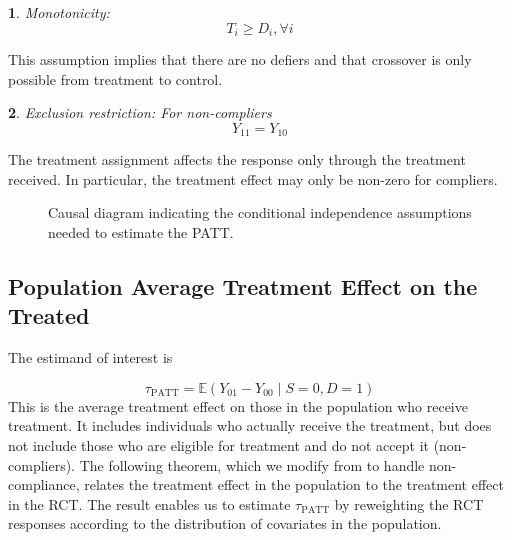 \documentclass[12pt]{article}
\makeatletter
\newtheorem*{assumption*}{\assumptionnumber}
\providecommand{\assumptionnumber}{}
\newenvironment{assumption}[2]
 {%
  \renewcommand{\assumptionnumber}{Assumption #1}%
  \begin{assumption*}%
  \protected@edef\@currentlabel{#1}%
 }
 {%
  \end{assumption*}
 }
\newcommand{\ex}{\mathbb{E}} %
\makeatother
\begin{document}
\begin{assumption}{6}{}\label{monotonicity}
Monotonicity: 
\begin{equation*}
T_i \geq D_i, \forall i
\end{equation*}
\end{assumption}
\noindent This assumption implies that there are no defiers and that crossover is only possible from treatment to control.

\begin{assumption}{7}{}\label{ER}
Exclusion restriction: For non-compliers
\begin{equation*}
Y_{11} = Y_{10}
\end{equation*}  
\end{assumption}
\noindent The treatment assignment affects the response only through the treatment received.  In particular, the treatment effect may only be non-zero for compliers.  

\begin{figure}[h]
\centering
{}
\caption{Causal diagram indicating the conditional independence assumptions needed to estimate the PATT.}\label{fig:DAG}
\end{figure}

\subsection{Population Average Treatment Effect on the Treated}
The estimand of interest is 

\begin{equation}
\tau_{\text{PATT}} = \ex\left( Y_{01} - Y_{00} \mid S=0, D=1\right)
\end{equation}
This is the average treatment effect on those in the population who receive treatment.  It includes individuals who actually receive the treatment, but does not include those who are eligible for treatment and do not accept it (non-compliers).  The following theorem, which we modify from \cite{Hartman} to handle non-compliance, relates the treatment effect in the population to the treatment effect in the RCT. The result enables us to estimate $\tau_{\text{PATT}}$ by reweighting the RCT responses according to the distribution of covariates in the population. 
\end{document}
